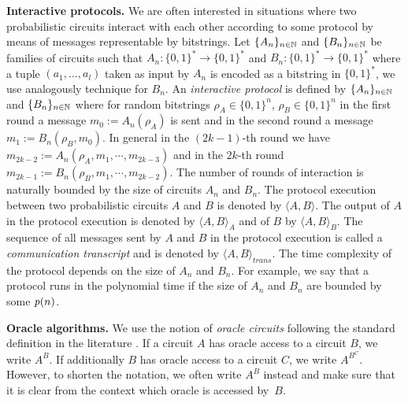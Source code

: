 \textbf{Interactive protocols.}
We are often interested in situations where two probabilistic circuits interact with
each other according to some protocol by means of messages representable by bitstrings.
Let $\{A_n\}_{n \in \mathbb{N}}$ and $\{B_n\}_{n \in \mathbb{N}}$ be families of circuits such that $A_n : \{0,1\}^{*} \rightarrow \{0,1\}^{*}$ and $B_n : \{0,1\}^{*} \rightarrow \{0,1\}^{*}$
where a tuple $(a_1, \dotsc, a_l)$ taken as input by $A_n$ is encoded as a bitstring in $\{0,1\}^{*}$, we use analogously technique for $B_n$.
An \textit{interactive protocol} is defined by $\{A_n\}_{n \in \mathbb{N}}$ and $\{B_n\}_{n \in \mathbb{N}}$ where
for random bitstrings $\rho_A \in \{0,1\}^{n}$, $\rho_B \in \{0,1\}^{n}$ in the first round a message $m_0 := A_n(\rho_A)$ is sent and in the second round a message $m_1 := B_n(\rho_B, m_0)$.
In general in the $(2k\!-\!1)$-th round we have $m_{2k-2} := A_n(\rho_A, m_1, \cdots, m_{2k-3})$ and in the $2k$-th round $m_{2k-1} := B_n(\rho_B, m_1, \cdots, m_{2k-2})$.
The number of rounds of interaction is naturally bounded by the size of circuits $A_n$ and $B_n$.
The protocol execution between two probabilistic circuits $A$ and $B$ is denoted by $\langle A, B \rangle$.
The output of $A$ in the protocol execution is denoted by $\langle A, B \rangle_A$ and of $B$ by $\langle A, B \rangle_B$.
The sequence of all messages sent by $A$ and $B$ in the protocol execution is called a \textit{communication transcript} and
is denoted by $\langle A, B \rangle_{\mathit{trans}}$.
The time complexity of the protocol depends on the size of $A_n$ and $B_n$.
For example, we say that a protocol runs in the polynomial time if the size of $A_n$ and $B_n$ are bounded by some $\operatorname{\mathit{p}}(n)$.

\textbf{Oracle algorithms.}
We use the notion of \textit{oracle circuits} following the standard definition in the literature \cite{Goldreich:2004:FCV:975541}.
If a circuit $A$ has oracle access to a circuit $B$, we write $A^B$. If additionally $B$ has oracle access to a circuit $C$,
we write $A^{B^C}$. However, to shorten the notation, we often write $A^{B}$ instead and make sure that it is clear from
the context which oracle is accessed by~$B$.

